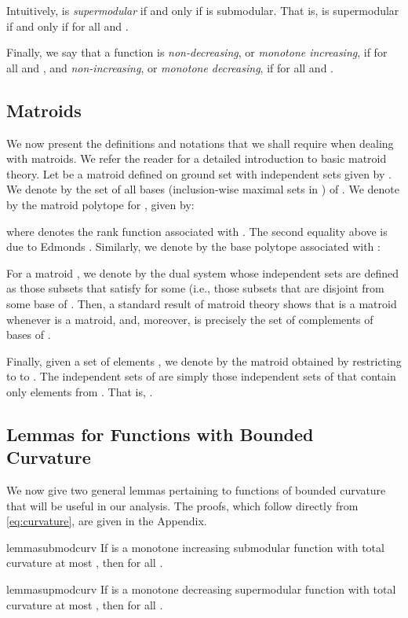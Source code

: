 \documentclass{article}
\theoremstyle{definition}
\begin{document}
Intuitively,  is \emph{supermodular} if and only if  is submodular.  That is,  is supermodular if and only if  for all  and .

Finally, we say that a function is \emph{non-decreasing}, or \emph{monotone increasing}, if  for all  and , and \emph{non-increasing}, or \emph{monotone decreasing}, if  for all  and . 

\subsection{Matroids}
\label{sec:matroids}
We now present the definitions and notations that we shall require when dealing with matroids.  We refer the reader \cite{Schrijver2003} for a detailed introduction to basic matroid theory.  Let  be a matroid defined on ground set  with independent sets given by .  We denote by  the set of all bases (inclusion-wise maximal sets in ) of .  We denote by  the matroid polytope for , given by:

where  denotes the rank function associated with .
The second equality above is due to Edmonds \cite{Edmonds1971}.  Similarly, we denote by  the base polytope associated with :


For a matroid , we denote by  the dual system  whose independent sets  are defined as those subsets  that satisfy  for some  (i.e., those subsets that are disjoint from some base of .  Then, a standard result of matroid theory shows that  is a matroid whenever  is a matroid, and, moreover,   is precisely the set  of complements of bases of .

Finally, given a set of elements , we denote by  the matroid  obtained by restricting to  to .  The independent sets  of  are simply those independent sets of  that contain only elements from .  That is, .

\subsection{Lemmas for Functions with Bounded Curvature}
\label{sec:curvature}

We now give two general lemmas pertaining to functions of bounded curvature that will be useful in our analysis.  The proofs, which follow directly from \eqref{eq:curvature}, are given in the Appendix.
\begin{restatable}{lemma}{submodcurv}
\label{lem:submod-curv}
If  is a monotone increasing submodular function with total curvature at most , then 
 for all .
\end{restatable}
\begin{restatable}{lemma}{supmodcurv}
\label{lem:supmod-curv}
If  is a monotone decreasing supermodular function with total curvature at most , then 
 for all .
\end{restatable}
\end{document}

